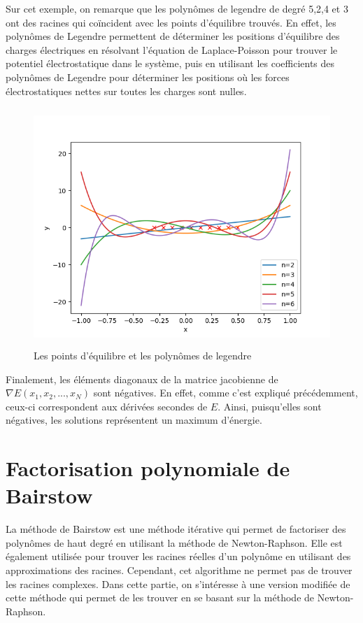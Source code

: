 \documentclass{article}
\begin{document}
Sur cet exemple, on remarque que les polynômes de legendre de degré 5,2,4 et 3 ont des racines qui coïncident avec les points d'équilibre trouvés. En effet, les polynômes de Legendre permettent de déterminer les positions d'équilibre des charges électriques en résolvant l'équation de Laplace-Poisson pour trouver le potentiel électrostatique dans le système, puis en utilisant les coefficients des polynômes de Legendre pour déterminer les positions où les forces électrostatiques nettes sur toutes les charges sont nulles.
\begin{figure}[h]
    \centering
    \includegraphics[width=15cm, height = 9cm]{Legendre.png}
    \caption{Les points d'équilibre et les polynômes de legendre}
    \label{fig:legendre}
\end{figure}
\newpage
Finalement, les éléments diagonaux de la matrice jacobienne de $\nabla E(x_{1}, x_{2} , ... , x_{N})$  sont négatives. En effet, comme c'est expliqué précédemment, ceux-ci correspondent aux dérivées secondes de $E$. Ainsi, puisqu’elles sont négatives, les solutions représentent un maximum d’énergie.







\section{Factorisation polynomiale de Bairstow}
La méthode de Bairstow est une méthode itérative qui permet de factoriser des polynômes de haut degré en utilisant la méthode de Newton-Raphson. Elle est également utilisée pour trouver les racines réelles d'un polynôme en utilisant des approximations des racines. Cependant, cet algorithme ne permet pas de trouver les racines complexes. Dans cette partie, on s'intéresse à une version modifiée de cette méthode qui permet de les trouver en se basant sur la méthode de Newton-Raphson.
\end{document}
